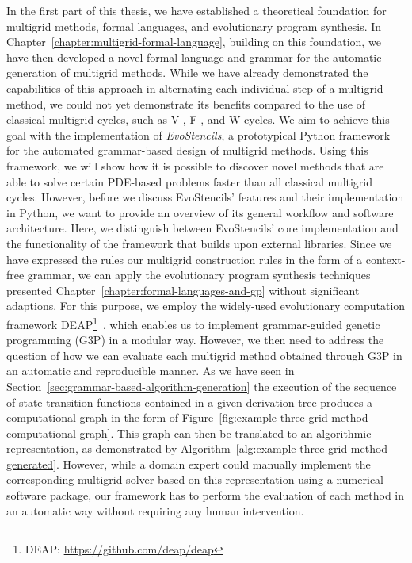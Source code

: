 In the first part of this thesis, we have established a theoretical foundation for multigrid methods, formal languages, and evolutionary program synthesis.
In Chapter~\ref{chapter:multigrid-formal-language}, building on this foundation, we have then developed a novel formal language and grammar for the automatic generation of multigrid methods. 
While we have already demonstrated the capabilities of this approach in alternating each individual step of a multigrid method, we could not yet demonstrate its benefits compared to the use of classical multigrid cycles, such as V-, F-, and W-cycles.
We aim to achieve this goal with the implementation of \emph{EvoStencils}, a prototypical Python framework for the automated grammar-based design of multigrid methods.
Using this framework, we will show how it is possible to discover novel methods that are able to solve certain PDE-based problems faster than all classical multigrid cycles.
However, before we discuss EvoStencils' features and their implementation in Python, we want to provide an overview of its general workflow and software architecture.
Here, we distinguish between EvoStencils' core implementation and the functionality of the framework that builds upon external libraries.
Since we have expressed the rules our multigrid construction rules in the form of a context-free grammar, we can apply the evolutionary program synthesis techniques presented Chapter~\ref{chapter:formal-languages-and-gp} without significant adaptions.
For this purpose, we employ the widely-used evolutionary computation framework DEAP\footnote{DEAP: \url{https://github.com/deap/deap}}~\cite{rainville2012deap}, which enables us to implement grammar-guided genetic programming (G3P) in a modular way.
However, we then need to address the question of how we can evaluate each multigrid method obtained through G3P in an automatic and reproducible manner.
As we have seen in Section~\ref{sec:grammar-based-algorithm-generation} the 
execution of the sequence of state transition functions contained in a given derivation tree produces a computational graph in the form of Figure~\ref{fig:example-three-grid-method-computational-graph}.
This graph can then be translated to an algorithmic representation, as demonstrated by Algorithm~\ref{alg:example-three-grid-method-generated}.
However, while a domain expert could manually implement the corresponding multigrid solver based on this representation using a numerical software package, our framework has to perform the evaluation of each method in an automatic way without requiring any human intervention.
